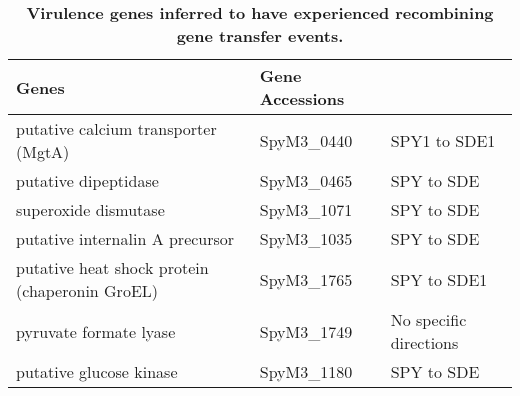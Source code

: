 \documentclass[10pt]{article}
\providecommand{\tabularnewline}{\\}
\begin{document}
\begin{table}
\caption{\label{tab:virrecomb}
\bf{Virulence genes inferred to have experienced recombining gene transfer
events.}}
\noindent \begin{centering}
\begin{tabular}{lll}
\hline 
Genes & Gene Accessions\tabularnewline
\hline 
putative calcium transporter (MgtA) & SpyM3\_0440 & SPY1 to SDE1\\
putative dipeptidase & SpyM3\_0465 & SPY to SDE\\
superoxide dismutase & SpyM3\_1071 & SPY to SDE\\
putative internalin A precursor & SpyM3\_1035 & SPY to SDE\\
putative heat shock protein (chaperonin GroEL) & SpyM3\_1765 & SPY to SDE1\\
pyruvate formate lyase & SpyM3\_1749 & No specific directions\\
putative glucose kinase & SpyM3\_1180 & SPY to SDE\\
\hline 
\end{tabular}
\par\end{centering}
\end{table}



\end{document}
